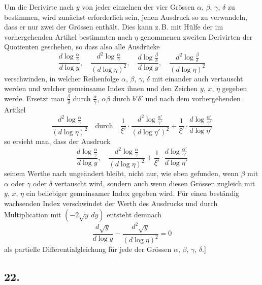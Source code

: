 \documentclass[10pt,a4paper]{article}
\begin{document}
Um die Derivirte nach $y$ von jeder einzelnen der vier Grössen $\alpha$, $\beta$, $\gamma$, $\delta$
zu bestimmen, wird zunächst erforderlich sein, jenen Ausdruck so zu verwandeln, dass er nur zwei der Grössen enthält. Dies kann z.\,B. mit Hülfe der im
vorhergehenden Artikel bestimmten nach $\eta$ genommenen zweiten Derivirten der
Quotienten geschehen, so dass also alle Ausdrücke
\[
\frac{d\log\frac{\alpha}{\gamma}}{d\log y}, \quad
\frac{d^2\log\frac{\alpha}{\gamma}}{(d\log\eta)^2}, \quad
\frac{d\log\frac{\beta}{\delta}}{d\log y}, \quad
\frac{d^2\log\frac{\beta}{\delta}}{(d\log\eta)^2}
\]
verschwinden, in welcher Reihenfolge $\alpha$, $\beta$, $\gamma$, $\delta$ mit einander auch vertauscht
werden und welcher gemeinsame Index ihnen und den Zeichen $y$, $x$, $\eta$ gegeben
werde. Ersetzt man $\frac{\beta}{\delta}$ durch $\frac{\alpha}{\gamma}$, $\alpha\beta$ durch $b'\delta'$ und nach dem vorhergehenden Artikel
\[
\frac{d^2\log\frac{\alpha}{\gamma}}{(d\log\eta)^2}\quad\text{durch}\quad
\frac{1}{\xi'}\cdot\frac{d^2\log\frac{\alpha'}{\gamma'}}{(d\log\eta')^2} + \frac{1}{\xi'}\cdot\frac{d\log\frac{\alpha'}{\gamma'}}{d\log\eta'}
\]
so ersieht man, dass der Ausdruck
\[
\frac{d\log\frac{\alpha}{\gamma}}{d\log y}, \quad
\frac{d^2\log\frac{\alpha}{\gamma}}{(d\log\eta)^2} + \frac{1}{\xi'}\cdot\frac{d\log\frac{\alpha'}{\gamma'}}{d\log\eta'}
\]
seinem Werthe nach ungeändert bleibt, nicht nur, wie eben gefunden, wenn $\beta$
mit $\alpha$ oder $\gamma$ oder $\delta$ vertauscht wird, sondern auch wenn diesen Grössen zugleich mit $y$, $x$, $\eta$ ein beliebiger gemeinsamer Index gegeben wird. Für einen
beständig wachsenden Index verschwindet der Werth des Ausdrucks und durch
Multiplication mit $(-2\sqrt{y}\,dy)$ entsteht demnach
\[
\frac{d\sqrt{y}}{d\log y} - \frac{d^2\sqrt{y}}{(d\log\eta)^2} = 0
\]
als partielle Differentialgleichung für jede der Grössen $\alpha$, $\beta$, $\gamma$, $\delta$.]


\subsection*{22.}
\end{document}
